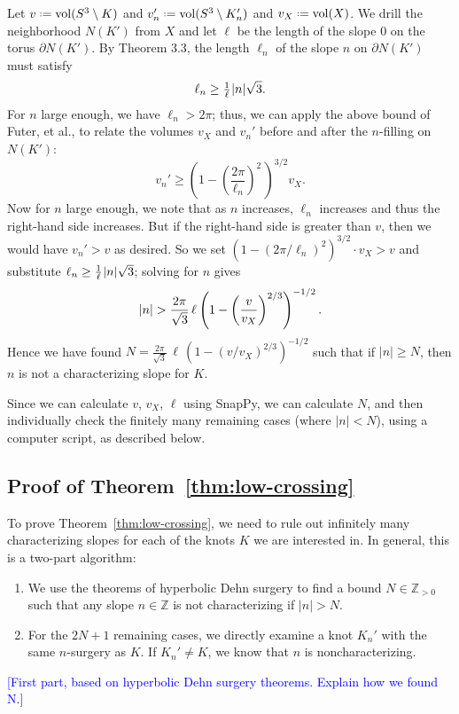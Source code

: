 \documentclass[11pt,usenames,dvipsnames,reqno]{amsart}
\newcommand{\zz}{\mathbb{Z}}
\newcommand{\vol}{\operatorname{vol}}
\newcommand{\defeq}{\mathrel{\vcenter{\baselineskip0.5ex\lineskiplimit0pt\hbox{\scriptsize.}\hbox{\scriptsize.}}}=}
\newcommand{\hs}{\hspace{0.05em}} %
\numberwithin{theorem}{section}
\theoremstyle{ex}
\theoremstyle{rem}
\def\kh#1{\textcolor{Blue}{#1}}
\begin{document}
Let $v\defeq\vol(S^3\setminus K)$ and $v_n'\defeq\vol(S^3\setminus K_n')$ and $v_X\defeq\vol(X)$. We drill the neighborhood $N(K')$ from $X$ and let $\ell$ be the length of the slope $0$ on the torus $\partial N(K')$. 
By Theorem 3.3, the length ${\ell}_n$ of the slope $n$ on $\partial N(K')$ must satisfy
$${\ell}_n\ge\tfrac{1}{\ell}\hs|n|\sqrt{3}.$$
For $n$ large enough, we have ${\ell}_n>2\pi$; thus, we can apply the above bound of Futer, et al., to relate the volumes $v_X$ and $v_n'$ before and after the $n$-filling on $N(K')$:
$$v_n'\ge\left(1-\left(\frac{2\pi}{{\ell}_n}\right)^2\,\right)^{3/2} v_X.$$
Now for $n$ large enough, we note that as $n$ increases, ${\ell}_n$ increases and thus the right-hand side increases. But if the right-hand side is greater than $v$, then we would have $v_n'>v$ as desired. So we set $(1-(2\pi/{\ell}_n)^2)^{3/2}\cdot v_X>v$ and substitute ${\ell}_n\ge\frac{1}{\ell}\hs|n|\sqrt{3}$; solving for $n$ gives
$$|n|>\frac{2\pi}{\sqrt{3}}\,\ell\hs\left(1-\left(\frac{v}{v_X}\right)^{2/3}\right)^{-1/2}.$$
Hence we have found $N=\frac{2\pi}{\sqrt{3}}\,\ell\,(1-(v/v_X)^{2/3})^{-1/2}$ such that if $|n|\ge N$, then $n$ is not a characterizing slope for $K$.

Since we can calculate $v$, $v_X$, $\ell$ using SnapPy, we can calculate $N$, and then individually check the finitely many remaining cases (where $|n|<N$), using a computer script, as described below.

\subsection{Proof of Theorem~\ref{thm:low-crossing}}

To prove Theorem~\ref{thm:low-crossing}, we need to rule out infinitely many characterizing slopes for each of the knots $K$ we are interested in. In general, this is a two-part algorithm:

\begin{enumerate}
	\item We use the theorems of hyperbolic Dehn surgery to find a bound $N \in \zz_{>0}$ such that any slope $n \in \zz$ is not characterizing if $|n|>N$.
	\item For the $2 N + 1$ remaining cases, we directly examine a knot $K_{n}'$ with the same $n$-surgery as $K$. If $K_{n}' \neq K$, we know that $n$ is noncharacterizing.
\end{enumerate}

\kh{[First part, based on hyperbolic Dehn surgery theorems. Explain how we found N.]}
\end{document}
